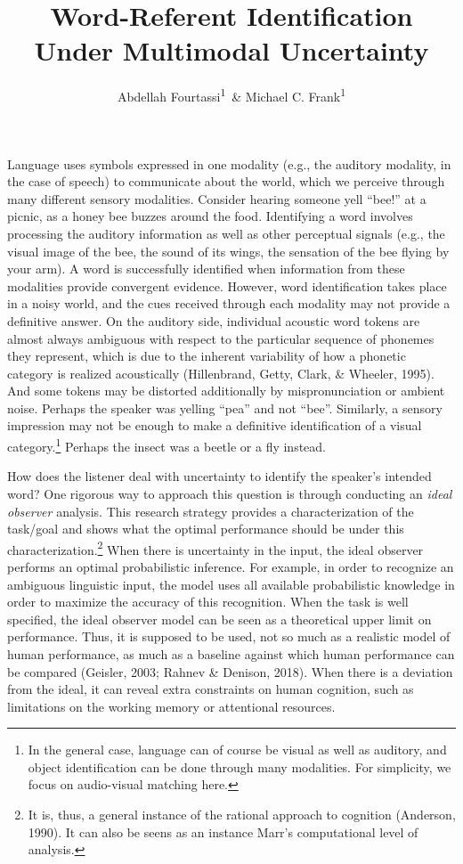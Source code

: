 \documentclass[english,floatsintext,man]{apa6}
\title{Word-Referent Identification Under Multimodal Uncertainty}
\author{Abdellah Fourtassi\textsuperscript{1}~\& Michael C. Frank\textsuperscript{1}}
\affiliation{
    \vspace{0.5cm}
          \textsuperscript{1} Department of Psychology, Stanford University  }
\theoremstyle{definition}
\theoremstyle{definition}
\theoremstyle{definition}
\theoremstyle{remark}
\begin{document}
\maketitle

\setcounter{secnumdepth}{0}



Language uses symbols expressed in one modality (e.g., the auditory
modality, in the case of speech) to communicate about the world, which
we perceive through many different sensory modalities. Consider hearing
someone yell \enquote{bee!} at a picnic, as a honey bee buzzes around
the food. Identifying a word involves processing the auditory
information as well as other perceptual signals (e.g., the visual image
of the bee, the sound of its wings, the sensation of the bee flying by
your arm). A word is successfully identified when information from these
modalities provide convergent evidence. However, word identification
takes place in a noisy world, and the cues received through each
modality may not provide a definitive answer. On the auditory side,
individual acoustic word tokens are almost always ambiguous with respect
to the particular sequence of phonemes they represent, which is due to
the inherent variability of how a phonetic category is realized
acoustically (Hillenbrand, Getty, Clark, \& Wheeler, 1995). And some
tokens may be distorted additionally by mispronunciation or ambient
noise. Perhaps the speaker was yelling \enquote{pea} and not
\enquote{bee}. Similarly, a sensory impression may not be enough to make
a definitive identification of a visual
category.\footnote{In the general case, language can of course be visual as well as auditory, and object identification can be done through many modalities. For simplicity, we focus on audio-visual matching here.}
Perhaps the insect was a beetle or a fly instead.

How does the listener deal with uncertainty to identify the speaker's
intended word? One rigorous way to approach this question is through
conducting an \emph{ideal observer} analysis. This research strategy
provides a characterization of the task/goal and shows what the optimal
performance should be under this characterization.\footnote{It is, thus,
  a general instance of the rational approach to cognition (Anderson,
  1990). It can also be seens as an instance Marr's computational level
  of analysis.} When there is uncertainty in the input, the ideal
observer performs an optimal probabilistic inference. For example, in
order to recognize an ambiguous linguistic input, the model uses all
available probabilistic knowledge in order to maximize the accuracy of
this recognition. When the task is well specified, the ideal observer
model can be seen as a theoretical upper limit on performance. Thus, it
is supposed to be used, not so much as a realistic model of human
performance, as much as a baseline against which human performance can
be compared (Geisler, 2003; Rahnev \& Denison, 2018). When there is a
deviation from the ideal, it can reveal extra constraints on human
cognition, such as limitations on the working memory or attentional
resources.
\end{document}

